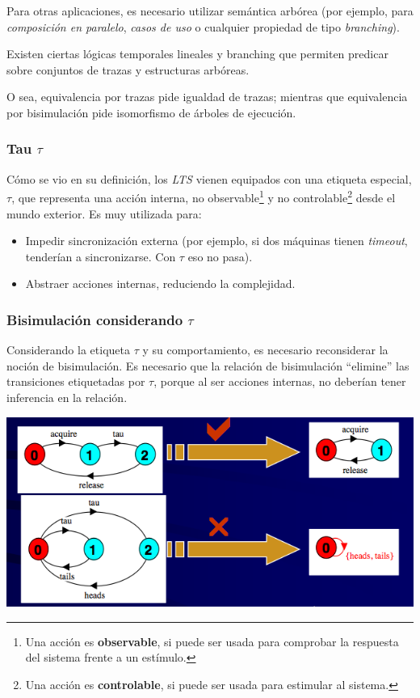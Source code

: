\documentclass[]{article}
\begin{document}
Para otras aplicaciones, es necesario utilizar semántica arbórea (por ejemplo, para \textit{composición en paralelo}, \textit{casos de uso} o cualquier propiedad de tipo \textit{branching}).

Existen ciertas lógicas temporales lineales y branching que permiten predicar sobre conjuntos de trazas y estructuras arbóreas.

O sea, equivalencia por trazas pide igualdad de trazas; mientras que equivalencia por bisimulación pide isomorfismo de árboles de ejecución.


\subsubsection{Tau $\tau$}
Cómo se vio en su definición, los \textit{LTS} vienen equipados con una etiqueta especial, $\tau$, que representa una acción interna, no observable\footnote{Una acción es \textbf{observable}, si puede ser usada para comprobar la respuesta del sistema frente a un estímulo.} y no controlable\footnote{Una acción es \textbf{controlable}, si puede ser usada para estimular al sistema.} desde el mundo exterior. Es muy utilizada para:
\begin{itemize}
	\item Impedir sincronización externa (por ejemplo, si dos máquinas tienen \textit{timeout}, tenderían a sincronizarse. Con $\tau$ eso no pasa).
	\item Abstraer acciones internas, reduciendo la complejidad.
\end{itemize}

\subsubsection{Bisimulación considerando $\tau$}
Considerando la etiqueta $\tau$ y su comportamiento, es necesario reconsiderar la noción de bisimulación. Es necesario que la relación de bisimulación ``elimine'' las transiciones etiquetadas por $\tau$, porque al ser acciones internas, no deberían tener inferencia en la relación.

\begin{center}
	\includegraphics[scale=0.5]{BisimTau.png}
\end{center}
\end{document}
